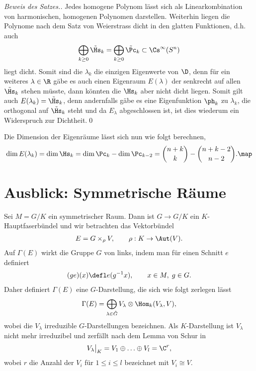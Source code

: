 \documentclass[%
	paper=a5,%
	fleqn,%
	DIV=18,%
	BCOR=0mm,
	fontsize=11pt,
	titlepage=false,%
	bibliography=totoc,
	DIV=18,%
	twoside=true,
	pdftitle=Riemannsche Geometrie,
	pdfauthor=Uwe Semmelmann,
	numbers=noendperiod]%
	{scrbook}
\begin{document}
\begin{proof}[Beweis des Satzes.]
Jedes homogene Polynom lässt sich als Linearkombination von harmonischen, homogenen Polynomen darstellen. Weiterhin liegen die Polynome nach dem Satz von Weierstrass dicht in den glatten Funktionen, d.h. auch
\begin{align*}
\bigoplus_{k\ge 0}\tilde\Hs_{k} = \bigoplus_{k\ge 0}\tilde\Pc_{k} \subset \Cs^\infty(S^n)
\end{align*}
liegt dicht. Somit sind die $\lambda_{k}$ die einzigen Eigenwerte von $\D$, denn für ein weiteres $\lambda\in\R$ gäbe es auch einen Eigenraum $E(\lambda)$ der senkrecht auf allen $\tilde\Hs_{k}$ stehen müsste, dann könnten die $\Hs_{k}$ aber nicht dicht liegen. Somit gilt auch $E(\lambda_{k}) = \tilde\Hs_{k}$, denn andernfalls gäbe es eine Eigenfunktion $\ph_{k}$ zu $\lambda_{k}$, die orthogonal auf $\tilde\Hs_{k}$ steht und da $E_{\lambda}$ abgeschlossen ist, ist dies wiederum ein Widerspruch zur Dichtheit.\qed
\end{proof}

\begin{rem}
Die Dimension der Eigenräume lässt sich nun wie folgt berechnen,
\begin{align*}
\dim E(\lambda_{k}) = \dim \Hs_{k} = 
\dim \Pc_{k}-\dim\Pc_{k-2} =
\binom{n+k}{k} - 
\binom{n+k-2}{n-2}.\map
\end{align*}
\end{rem}

\section{Ausblick: Symmetrische Räume}

Sei $M=G/K$ ein symmetrischer Raum. Dann ist $G\to G/K$ ein $K$-Hauptfaserbündel und wir betrachten das Vektorbündel
\begin{align*}
E = G\times_{\rho}V,\qquad \rho: K\to \Aut(V).
\end{align*}
Auf $\Gamma(E)$ wirkt die Gruppe $G$ von links, indem man für einen Schnitt $e$ definiert
\begin{align*}
(ge)(x) \defl e(g^{-1}x),\qquad x\in M,\; g\in G.
\end{align*}
Daher definiert $\Gamma(E)$ eine $G$-Darstellung, die sich wie folgt zerlegen lässt
\begin{align*}
\Gamma(E) = \bigoplus_{\lambda\in\hat{G}} V_{\lambda}\otimes \Hom_{k}(V_{\lambda},V),
\end{align*}
wobei die $V_{\lambda}$ irreduzible $G$-Darstellungen bezeichnen. Als $K$-Darstellung ist $V_{\lambda}$ nicht mehr irreduzibel und zerfällt nach dem Lemma von Schur in
\begin{align*}
V_{\lambda}\big|_{K} = V_{1}\oplus \ldots \oplus V_{l} = \C^r,
\end{align*}
wobei $r$ die Anzahl der $V_{i}$ für $1\le i\le l$ bezeichnet mit $V_{i}\cong V$.
\end{document}
